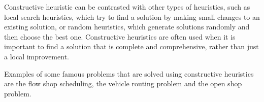 Constructive heuristic can be contrasted with other types of heuristics, such as local search heuristics, which try to find a solution by making small changes to an existing solution, or random heuristics, which generate solutions randomly and then choose the best one. Constructive heuristics are often used when it is important to find a solution that is complete and comprehensive, rather than just a local improvement.
\bigskip

Examples of some famous problems that are solved using constructive heuristics are the flow shop scheduling, the vehicle routing problem and the open shop problem.


